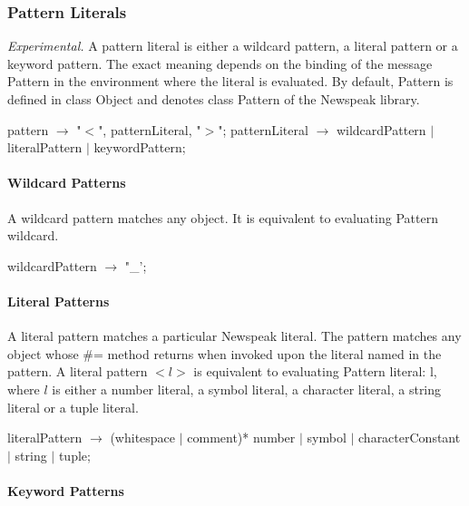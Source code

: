 \documentclass{article}
\newcommand{\code}[1]{{\sf #1}}
\begin{document}
\subsubsection{Pattern Literals}
\label{patLiteral}

{\it Experimental.} A pattern literal is either a wildcard pattern, a literal pattern or a keyword pattern. The exact meaning depends on the binding of the message \code{Pattern} in the environment where the literal is evaluated. By default, \code{Pattern} is defined in class \code{Object} and denotes class \code{Pattern} of the Newspeak library. 

\begin{newspeak}
pattern $\rightarrow$ "$<$", patternLiteral,  "$>$";
patternLiteral $\rightarrow$ wildcardPattern $|$ literalPattern $|$ keywordPattern;
\end{newspeak}


\paragraph{Wildcard Patterns}
\label{wildcardPattern}

A wildcard pattern matches any object. It is equivalent to evaluating \code{Pattern wildcard}.

\begin{newspeak}
wildcardPattern $\rightarrow$ "\_';
\end{newspeak}

\paragraph{Literal Patterns}
\label{literalPattern}

A literal pattern matches a particular Newspeak literal. The pattern matches any object whose \#= method returns \TRUE{} when invoked upon the literal named in the pattern. A literal pattern $<l>$  is equivalent to evaluating \code{Pattern literal: l}, where $l$ is either a number literal, a symbol literal, a character literal, a string literal or a tuple literal. 

\begin{newspeak}
literalPattern $\rightarrow$ (whitespace $|$ comment)*  number $|$ symbol $|$ characterConstant $|$ string $|$ tuple;
\end{newspeak}

\paragraph{Keyword Patterns}
\label{keywordPattern}
\end{document}
